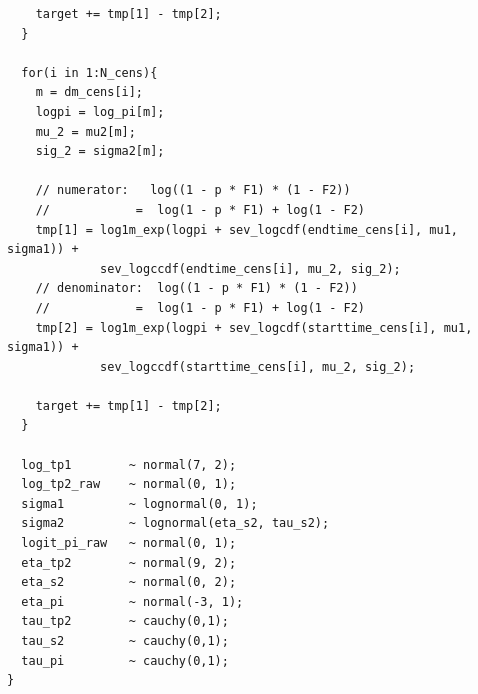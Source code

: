\documentclass[12pt]{article}
\begin{document}
{\begin{verbatim}
    target += tmp[1] - tmp[2];
  }
  
  for(i in 1:N_cens){
    m = dm_cens[i];
    logpi = log_pi[m];
    mu_2 = mu2[m];
    sig_2 = sigma2[m];
  
    // numerator:   log((1 - p * F1) * (1 - F2))
    //            =  log(1 - p * F1) + log(1 - F2)
    tmp[1] = log1m_exp(logpi + sev_logcdf(endtime_cens[i], mu1, sigma1)) + 
             sev_logccdf(endtime_cens[i], mu_2, sig_2);
    // denominator:  log((1 - p * F1) * (1 - F2))
    //            =  log(1 - p * F1) + log(1 - F2)
    tmp[2] = log1m_exp(logpi + sev_logcdf(starttime_cens[i], mu1, sigma1)) + 
             sev_logccdf(starttime_cens[i], mu_2, sig_2);
             
    target += tmp[1] - tmp[2];
  }
  
  log_tp1        ~ normal(7, 2);
  log_tp2_raw    ~ normal(0, 1);
  sigma1         ~ lognormal(0, 1);
  sigma2         ~ lognormal(eta_s2, tau_s2);
  logit_pi_raw   ~ normal(0, 1);
  eta_tp2        ~ normal(9, 2);
  eta_s2         ~ normal(0, 2);
  eta_pi         ~ normal(-3, 1);
  tau_tp2        ~ cauchy(0,1);
  tau_s2         ~ cauchy(0,1);
  tau_pi         ~ cauchy(0,1);
}

\end{verbatim}
}

\pagebreak
\end{document}
